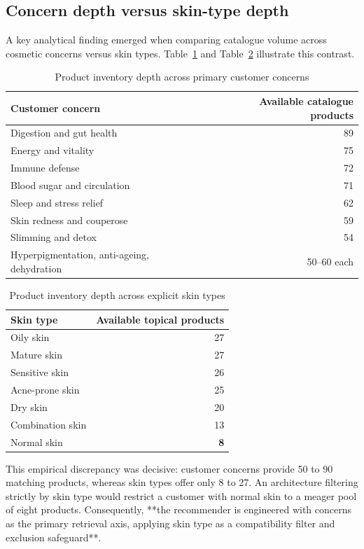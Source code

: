 \subsection{Concern depth versus skin-type depth}

A key analytical finding emerged when comparing catalogue volume across cosmetic concerns versus skin types. Table~\ref{tab:concerns} and Table~\ref{tab:skintypes} illustrate this contrast.

\begin{table}[H]
\caption{Product inventory depth across primary customer concerns}
\label{tab:concerns}
\centering
\begin{tabularx}{\textwidth}{X r}
\toprule
\textbf{Customer concern} & \textbf{Available catalogue products} \\
\midrule
Digestion and gut health & 89 \\
Energy and vitality & 75 \\
Immune defense & 72 \\
Blood sugar and circulation & 71 \\
Sleep and stress relief & 62 \\
Skin redness and couperose & 59 \\
Slimming and detox & 54 \\
Hyperpigmentation, anti-ageing, dehydration & 50--60 each \\
\bottomrule
\end{tabularx}
\end{table}

\begin{table}[H]
\caption{Product inventory depth across explicit skin types}
\label{tab:skintypes}
\centering
\begin{tabularx}{\textwidth}{X r}
\toprule
\textbf{Skin type} & \textbf{Available topical products} \\
\midrule
Oily skin & 27 \\
Mature skin & 27 \\
Sensitive skin & 26 \\
Acne-prone skin & 25 \\
Dry skin & 20 \\
Combination skin & 13 \\
Normal skin & \textbf{8} \\
\bottomrule
\end{tabularx}
\end{table}

This empirical discrepancy was decisive: customer concerns provide 50 to 90 matching products, whereas skin types offer only 8 to 27. An architecture filtering strictly by skin type would restrict a customer with normal skin to a meager pool of eight products. Consequently, **the recommender is engineered with concerns as the primary retrieval axis, applying skin type as a compatibility filter and exclusion safeguard**.

